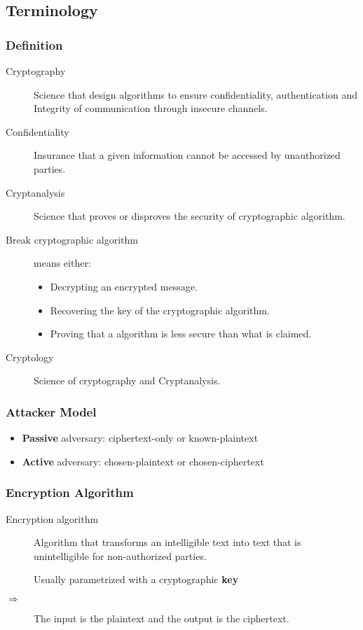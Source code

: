 \subsection{Terminology}
\subsubsection{Definition}
\begin{description}
    \item[Cryptography] Science that design algorithms to ensure
        confidentiality, authentication and Integrity of communication
        through insecure channels.
    \item[Confidentiality] Insurance that a given information cannot be accessed
        by unauthorized parties.
    \item[Cryptanalysis] Science that proves or disproves the security of
        cryptographic algorithm.
    \item[Break cryptographic algorithm] means either:
        \begin{itemize}
            \item Decrypting an encrypted message.
            \item Recovering the key of the cryptographic algorithm.
            \item Proving that a algorithm is less secure than what is claimed.
        \end{itemize}
    \item[Cryptology] Science of cryptography and Cryptanalysis.
\end{description}

\subsubsection{Attacker Model}
\begin{itemize}
    \item \textbf{Passive} adversary: ciphertext-only or known-plaintext
    \item \textbf{Active} adversary: chosen-plaintext or chosen-ciphertext
\end{itemize}

\subsubsection{Encryption Algorithm}
\begin{description}
    \item[Encryption algorithm] Algorithm that transforms an intelligible text
        into text that is unintelligible for non-authorized parties. 

        Usually parametrized with a cryptographic \textbf{key}

    \item[$\Rightarrow$]The input is the plaintext and the output is the ciphertext.
\end{description}


